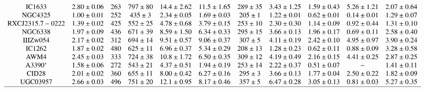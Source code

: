 \documentclass{aa} %
\begin{document}
\begin{table*}[htp]
$$\begin{array}{ccccccccccc}
{\rm IC1633 }  & 2.80\pm0.06 & 263 & 797\pm80 & 14.4\pm2.62 & 11.5\pm1.65 & 289\pm35 & 3.43\pm1.25 & 1.59\pm0.43 & 5.26\pm1.21 & 2.07\pm0.64 \\ 
{\rm NGC4325} & 1.00\pm0.01 & 252 & 435\pm3 & 2.34\pm0.05 & 1.69\pm0.03 & 205\pm1 & 1.22\pm0.01 & 0.62\pm0.01 & 0.14\pm0.01 & 1.29\pm0.07 \\ 
{\rm RXCJ2315.7-0222} & 1.39\pm0.02 & 425 & 552\pm25 & 4.78\pm0.68 & 3.79\pm0.15 & 253\pm10 & 2.30\pm0.30 & 1.14\pm0.09 & 0.92\pm0.44 & 1.31\pm0.10 \\ 
{\rm NGC6338} & 1.97\pm0.09 & 436 & 671\pm39 & 8.59\pm1.50 & 6.34\pm0.33 & 295\pm15 & 3.66\pm0.13 & 1.96\pm0.17 & 0.69\pm0.11 & 2.58\pm0.40 \\ 
{\rm IIIZw054}& 2.17\pm0.02 & 312 & 694\pm14 & 9.51\pm0.57 & 9.06\pm0.37 & 307\pm5 & 4.11\pm0.19 & 2.42\pm0.10 & 4.95\pm0.97 & 3.90\pm0.24 \\ 
{\rm IC1262 } & 1.87\pm0.02 & 480 & 625\pm11 & 6.96\pm0.37 & 5.34\pm0.29 & 208\pm13 & 1.28\pm0.23 & 0.62\pm0.11 & 0.88\pm0.09 & 3.28\pm0.58 \\ 
{\rm AWM4  	} & 2.45\pm0.03 & 333 & 724\pm38 & 10.8\pm1.72 & 6.50\pm0.35 & 309\pm12 & 4.19\pm0.49 & 2.16\pm0.15 & 4.41\pm0.25 & 2.87\pm0.25 \\ 
{\rm A3390^{*}} & 1.58\pm0.06 & 272 & 543\pm21 & 4.37\pm0.51 & 1.94\pm0.19 & 253\pm14 & 2.22\pm0.37 & 0.51\pm0.07 & - & 1.41\pm0.11 \\ 
{\rm CID28}   & 2.01\pm0.02 & 360 & 655\pm11 & 8.00\pm0.42 & 6.27\pm0.16 & 295\pm3 & 3.66\pm0.13 & 1.77\pm0.04 & 2.50\pm0.22 & 1.82\pm0.09 \\ 
{\rm UGC03957}& 2.66\pm0.03 & 496 & 751\pm20 & 12.1\pm0.95 & 8.17\pm0.46 & 357\pm5 & 6.47\pm0.28 & 3.05\pm0.13 & 0.81\pm0.03 & 5.27\pm0.35 \\ 
\hline
\end{array}
\label{tab:propgroups}
$$
\end{table*}
\end{document}
